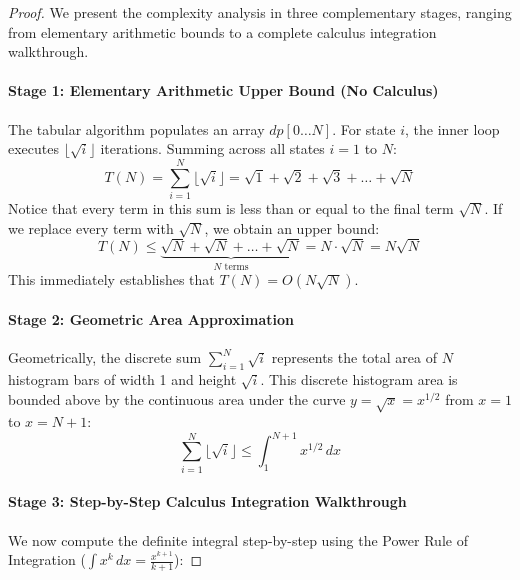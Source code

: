 \documentclass[10pt,journal,compsoc,onecolumn]{IEEEtran}
\begin{document}
\begin{proof}
We present the complexity analysis in three complementary stages, ranging from elementary arithmetic bounds to a complete calculus integration walkthrough.

\paragraph{\textbf{Stage 1: Elementary Arithmetic Upper Bound (No Calculus)}}
The tabular algorithm populates an array $dp[0 \dots N]$. For state $i$, the inner loop executes $\lfloor \sqrt{i} \rfloor$ iterations. Summing across all states $i = 1$ to $N$:
\[
T(N) = \sum_{i=1}^{N} \lfloor \sqrt{i} \rfloor = \sqrt{1} + \sqrt{2} + \sqrt{3} + \dots + \sqrt{N}
\]
Notice that every term in this sum is less than or equal to the final term $\sqrt{N}$. If we replace every term with $\sqrt{N}$, we obtain an upper bound:
\[
T(N) \le \underbrace{\sqrt{N} + \sqrt{N} + \dots + \sqrt{N}}_{N \text{ terms}} = N \cdot \sqrt{N} = N \sqrt{N}
\]
This immediately establishes that $T(N) = O(N \sqrt{N})$.

\paragraph{\textbf{Stage 2: Geometric Area Approximation}}
Geometrically, the discrete sum $\sum_{i=1}^N \sqrt{i}$ represents the total area of $N$ histogram bars of width 1 and height $\sqrt{i}$. This discrete histogram area is bounded above by the continuous area under the curve $y = \sqrt{x} = x^{1/2}$ from $x = 1$ to $x = N + 1$:
\[
\sum_{i=1}^{N} \lfloor \sqrt{i} \rfloor \le \int_{1}^{N+1} x^{1/2} \, dx
\]

\paragraph{\textbf{Stage 3: Step-by-Step Calculus Integration Walkthrough}}
We now compute the definite integral step-by-step using the Power Rule of Integration ($\int x^k \, dx = \frac{x^{k+1}}{k+1}$):


\end{proof}
\end{document}
